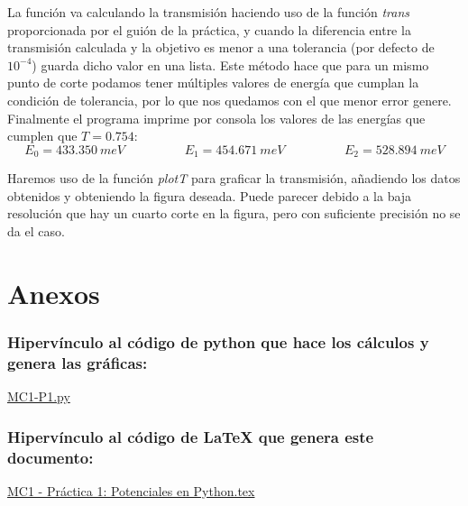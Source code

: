 \documentclass[11pt]{article}
\begin{document}
    \noindent La función va calculando la transmisión haciendo uso de la función \textit{trans} proporcionada por el guión de la práctica, y cuando la diferencia entre la transmisión calculada y la objetivo es menor a una tolerancia (por defecto de $10^{-4}$) guarda dicho valor en una lista. Este método hace que para un mismo punto de corte podamos tener múltiples valores de energía que cumplan la condición de tolerancia, por lo que nos quedamos con el que menor error genere.\\

    \noindent Finalmente el programa imprime por consola los valores de las energías que cumplen que $T=0.754$:
    \begin{equation}
        E_0 = 433.350\ meV \hspace{2cm} E_1 = 454.671\ meV \hspace{2cm} E_2 = 528.894\ meV
    \end{equation}

    \noindent Haremos uso de la función \textit{plotT} para graficar la transmisión, añadiendo los datos obtenidos y obteniendo la figura deseada. Puede parecer debido a la baja resolución que hay un cuarto corte en la figura, pero con suficiente precisión no se da el caso.

\section{Anexos}
    \subsubsection*{Hipervínculo al código de python que hace los cálculos y genera las gráficas:}
        \href{https://github.com/vmr48-ua/extras/blob/main/MC1-P1.py}{MC1-P1.py}
    \subsubsection*{Hipervínculo al código de LaTeX que genera este documento:}
        \href{https://www.overleaf.com/read/dfygzrrhtvtd#b13bac}{MC1 - Práctica 1: Potenciales en Python.tex}
    
\end{document}
